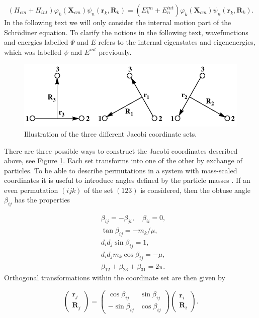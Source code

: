 \documentclass{article}
\numberwithin{equation}{section}
\numberwithin{figure}{section}
\begin{document}
\begin{equation}
(H_{cm} + H_{int})\varphi_{k}(\mathbf{X}_{cm})\psi_{n}(\mathbf{r}_k,\mathbf{R}_k) = (E_k^{cm} + E_n^{int})\varphi_{k}(\mathbf{X}_{cm})\psi_{n}(\mathbf{r}_k,\mathbf{R}_k).
\end{equation}
In the following text we will only consider the internal motion part of the  Schr{\"o}diner equation. To clarify the notions in the following text, wavefunctions and energies labelled $\Psi$ and $E$ refers to the internal eigenstates and eigenenergies, which was labelled $\psi$ and $E^{int}$ previously. 

\begin{figure}
	\includegraphics[width=\linewidth]{jacobii.pdf}
	\caption{Illustration of the three different Jacobi coordinate sets.}
	\label{fig:2}
\end{figure}

There are three possible ways to construct the Jacobi coordinates described above, see Figure \ref{fig:2}. Each set transforms into one of the other by exchange of particles. To be able to describe permutations in a system with mass-scaled coordinates it is useful to introduce angles defined by the particle masses \cite{Smith1962}. If an even permutation $(ijk)$ of the set $(123)$ is considered, then the obtuse angle $\beta_{ij}$ has the properties

\begin{subequations}
	\begin{align}
	&\beta_{ij} = -\beta_{ji}, \quad \beta_{ii} = 0,\\
	&\tan\beta_{ij} = -m_k/\mu,\\
	&d_{i}d_{j} \sin\beta_{ij} = 1,\\
	&d_{i}d_{j} m_{k} \cos\beta_{ij} = -\mu,\\
	&\beta_{12}+\beta_{23}+\beta_{31} = 2\pi.
	\end{align}
\end{subequations}
Orthogonal transformations within the coordinate set are then given by 

\begin{equation}
\begin{pmatrix}
\mathbf{r}_j\\
\mathbf{R}_j
\end{pmatrix}
=
\begin{pmatrix}
\cos\beta_{ij} & \sin\beta_{ij}\\
-\sin\beta_{ij} & \cos\beta_{ij}
\end{pmatrix}
\begin{pmatrix}
\mathbf{r}_i\\
\mathbf{R}_i
\end{pmatrix}.
\end{equation}   
\end{document}
